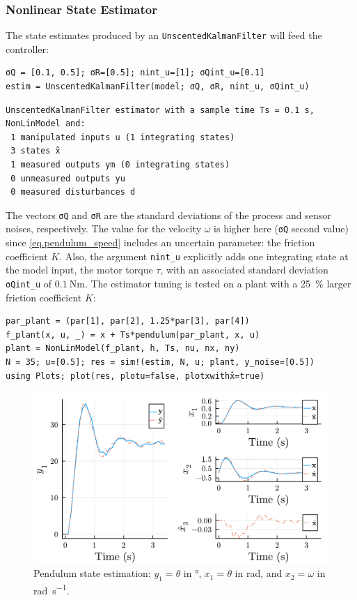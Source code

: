 \subsubsection{Nonlinear State Estimator}

The state estimates produced by an \texttt{UnscentedKalmanFilter} will feed the controller:

\begin{verbatim}
σQ = [0.1, 0.5]; σR=[0.5]; nint_u=[1]; σQint_u=[0.1]
estim = UnscentedKalmanFilter(model; σQ, σR, nint_u, σQint_u)
\end{verbatim}
\spacerepl
\begin{verbatim}
UnscentedKalmanFilter estimator with a sample time Ts = 0.1 s, 
NonLinModel and:
 1 manipulated inputs u (1 integrating states)
 3 states x̂
 1 measured outputs ym (0 integrating states)
 0 unmeasured outputs yu
 0 measured disturbances d
\end{verbatim}
The vectors \texttt{σQ} and \texttt{σR} are the standard deviations of the process and sensor noises, respectively. The value for the velocity $\omega$ is higher here (\texttt{σQ} second value) since \eqref{eq.pendulum_speed} includes an uncertain parameter: the friction coefficient $K$. Also, the argument \texttt{nint\_u} explicitly adds one integrating state at the model input, the motor torque $\tau$, with an associated standard deviation \texttt{σQint\_u} of $\SI{0.1}{\newton\meter}$. The estimator tuning is tested on a plant with a \SI{25}{\percent} larger friction coefficient $K$:
\begin{verbatim}
par_plant = (par[1], par[2], 1.25*par[3], par[4])
f_plant(x, u, _) = x + Ts*pendulum(par_plant, x, u)
plant = NonLinModel(f_plant, h, Ts, nu, nx, ny)
N = 35; u=[0.5]; res = sim!(estim, N, u; plant, y_noise=[0.5])
using Plots; plot(res, plotu=false, plotxwithx̂=true)
\end{verbatim}

\begin{figure}[t]
    \centering
    \includegraphics[width=\columnwidth]{fig/plot_NonLinMPC1.pdf}
    \caption{Pendulum state estimation: $y_1 = \theta$ in \si{\degree}, $x_1=\theta$ in \si{\radian}, and $x_2=\omega$ in \si{\radian\per\second}.}
    \label{fig:plot_NonLinMPC1}
\end{figure}

